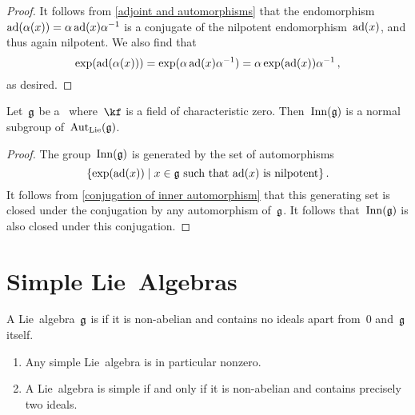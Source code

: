 \begin{proof}
  It follows from \cref{adjoint and automorphisms} that the endomorphism~$\operatorname{ad}(\alpha(x)) = \alpha \operatorname{ad}(x) \alpha^{-1}$ is a conjugate of the nilpotent endomorphism~$\operatorname{ad}(x)$, and thus again nilpotent.
  We also find that
  \[
    \exp( \operatorname{ad}(\alpha(x)) )
    =
    \exp( \alpha \operatorname{ad}(x) \alpha^{-1} )
    =
    \alpha \exp(\operatorname{ad}(x)) \alpha^{-1} \,,
  \]
  as desired.
\end{proof}


\begin{proposition}
  Let~$\mathfrak{g}$ be a~\liealgebra{$\kf$} where~$\kf$ is a field of characteristic zero.
  Then~$\operatorname{Inn}(\mathfrak{g})$ is a normal subgroup of~$\operatorname{Aut}_{\mathrm{Lie}}(\mathfrak{g})$.
\end{proposition}


\begin{proof}
  The group~$\operatorname{Inn}(\mathfrak{g})$ is generated by the set of automorphisms
  \[
    \{
      \exp(\ad(x))
    \suchthat
      \text{$x \in \glie$ such that~$\ad(x)$ is nilpotent}
    \} \,.
  \]
  It follows from \cref{conjugation of inner automorphism} that this generating set is closed under the conjugation by any automorphism of~$\mathfrak{g}$.
  It follows that~$\operatorname{Inn}(\mathfrak{g})$ is also closed under this conjugation.
\end{proof}





\section{Simple Lie~Algebras}


\begin{definition}
 A Lie~algebra~$\mathfrak{g}$ is  if it is non-abelian and contains no ideals apart from~$0$ and~$\mathfrak{g}$ itself.
\end{definition}


\begin{remark}
  \leavevmode
  \begin{enumerate}
    \item
      Any simple Lie~algebra is in particular nonzero.
    \item
      A Lie~algebra is simple if and only if it is non-abelian and contains precisely two ideals.
  \end{enumerate}
\end{remark}



